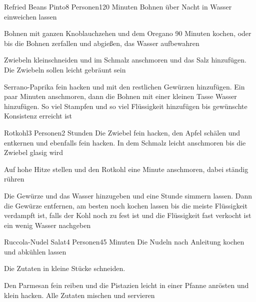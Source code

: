 \begin{recipe}{Refried Beans Pinto}{8 Personen}{120 Minuten}
Bohnen über Nacht in Wasser einweichen lassen

Bohnen mit ganzen Knoblauchzehen und dem Oregano 90 Minuten kochen, oder bis die Bohnen zerfallen und abgießen, das Wasser aufbewahren

Zwiebeln kleinschneiden und im Schmalz anschmoren und das Salz hinzufügen. Die Zwiebeln sollen leicht gebräunt sein

Serrano-Paprika fein hacken und mit den restlichen Gewürzen hinzufügen.
Ein paar Minuten anschmoren, dann die Bohnen mit einer kleinen Tasse Wasser hinzufügen.
So viel Stampfen und so viel Flüssigkeit hinzufügen bis gewünschte Konsistenz erreicht ist
\end{recipe}


\begin{recipe}{Rotkohl}{3 Personen}{2 Stunden}
Die Zwiebel fein hacken, den Apfel schälen und entkernen und ebenfalls fein hacken. In dem Schmalz leicht anschmoren bis die Zwiebel glasig wird

Auf hohe Hitze stellen und den Rotkohl eine Minute anschmoren, dabei ständig rühren

Die Gewürze  und das Wasser hinzugeben und eine Stunde simmern lassen. Dann die Gewürze entfernen, am besten noch kochen lassen bis die meiste Flüssigkeit verdampft ist, falls der Kohl noch zu fest ist und die Flüssigkeit fast verkocht ist ein wenig Wasser nachgeben
\end{recipe}


\begin{recipe}{Ruccola-Nudel Salat}{4 Personen}{45 Minuten}
Die Nudeln nach Anleitung kochen und abkühlen lassen
 
Die Zutaten in kleine Stücke schneiden.

Den Parmesan fein reiben und die Pistazien leicht in einer Pfanne anrösten und klein hacken. Alle Zutaten mischen und servieren
\end{recipe}

